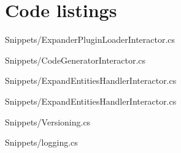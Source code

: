 \chapter{Code listings} \label{appendix_code_listings} 

 
  {Snippets/ExpanderPluginLoaderInteractor.cs}

 
  {Snippets/CodeGeneratorInteractor.cs}

 
  {Snippets/ExpandEntitiesHandlerInteractor.cs}

  
    {Snippets/ExpandEntitiesHandlerInteractor.cs}

   
    {Snippets/Versioning.cs}

     
      {Snippets/logging.cs}